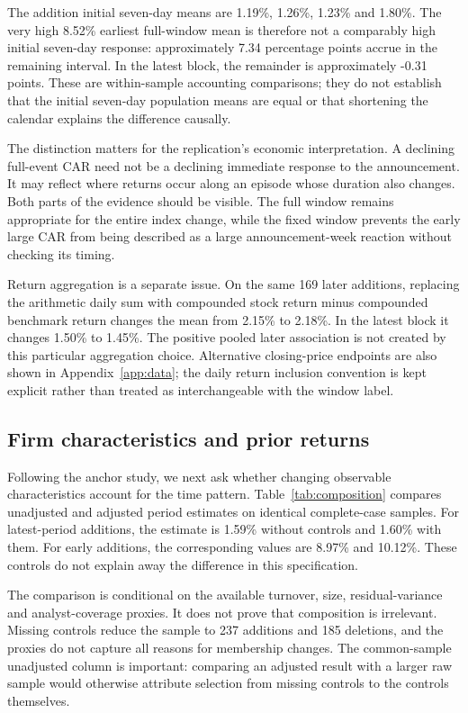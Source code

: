 The addition initial seven-day means are 1.19\%, 1.26\%, 1.23\% and 1.80\%. The very high 8.52\% earliest full-window mean is therefore not a comparably high initial seven-day response: approximately 7.34 percentage points accrue in the remaining interval. In the latest block, the remainder is approximately -0.31 points. These are within-sample accounting comparisons; they do not establish that the initial seven-day population means are equal or that shortening the calendar explains the difference causally.

The distinction matters for the replication's economic interpretation. A declining full-event CAR need not be a declining immediate response to the announcement. It may reflect where returns occur along an episode whose duration also changes. Both parts of the evidence should be visible. The full window remains appropriate for the entire index change, while the fixed window prevents the early large CAR from being described as a large announcement-week reaction without checking its timing.

Return aggregation is a separate issue. On the same 169 later additions, replacing the arithmetic daily sum with compounded stock return minus compounded benchmark return changes the mean from 2.15\% to 2.18\%. In the latest block it changes 1.50\% to 1.45\%. The positive pooled later association is not created by this particular aggregation choice. Alternative closing-price endpoints are also shown in Appendix~\ref{app:data}; the daily return inclusion convention is kept explicit rather than treated as interchangeable with the window label.

\subsection{Firm characteristics and prior returns}

Following the anchor study, we next ask whether changing observable characteristics account for the time pattern. Table~\ref{tab:composition} compares unadjusted and adjusted period estimates on identical complete-case samples. For latest-period additions, the estimate is 1.59\% without controls and 1.60\% with them. For early additions, the corresponding values are 8.97\% and 10.12\%. These controls do not explain away the difference in this specification.



The comparison is conditional on the available turnover, size, residual-variance and analyst-coverage proxies. It does not prove that composition is irrelevant. Missing controls reduce the sample to 237 additions and 185 deletions, and the proxies do not capture all reasons for membership changes. The common-sample unadjusted column is important: comparing an adjusted result with a larger raw sample would otherwise attribute selection from missing controls to the controls themselves.

